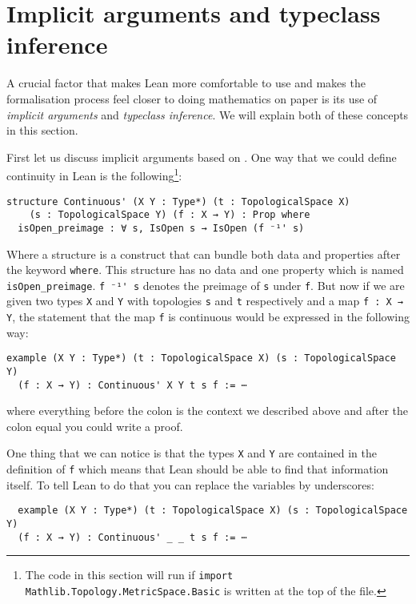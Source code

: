 \section{Implicit arguments and typeclass inference}
\label{sec:implicitandtypeclass}

A crucial factor that makes Lean more comfortable to use and makes the formalisation process feel closer to doing mathematics on paper is its use of \emph{implicit arguments} and \emph{typeclass inference}. 
We will explain both of these concepts in this section.

First let us discuss implicit arguments based on \cite{Avigad2024}. 
One way that we could define continuity in Lean is the following\cprotect\footnote{The code in this section will run if \lstinline{import Mathlib.Topology.MetricSpace.Basic} is written at the top of the file.}:

\begin{lstlisting}
structure Continuous' (X Y : Type*) (t : TopologicalSpace X) 
    (s : TopologicalSpace Y) (f : X → Y) : Prop where
  isOpen_preimage : ∀ s, IsOpen s → IsOpen (f ⁻¹' s)
\end{lstlisting}

Where a structure is a construct that can bundle both data and properties after the keyword \lstinline{where}. 
This structure has no data and one property which is named \lstinline{isOpen_preimage}. 
\lstinline{f ⁻¹' s} denotes the preimage of \lstinline{s} under \lstinline{f}.
But now if we are given two types \lstinline{X} and \lstinline{Y} with topologies \lstinline{s} and \lstinline{t} respectively and a map \lstinline{f : X → Y}, the statement that the map \lstinline{f} is continuous would be expressed in the following way:

\begin{lstlisting}
example (X Y : Type*) (t : TopologicalSpace X) (s : TopologicalSpace Y) 
  (f : X → Y) : Continuous' X Y t s f := ⋯
\end{lstlisting}

where everything before the colon is the context we described above and after the colon equal you could write a proof.

One thing that we can notice is that the types \lstinline{X} and \lstinline{Y} are contained in the definition of \lstinline{f} which means that Lean should be able to find that information itself. 
To tell Lean to do that you can replace the variables by underscores: 

\begin{lstlisting}
  example (X Y : Type*) (t : TopologicalSpace X) (s : TopologicalSpace Y) 
  (f : X → Y) : Continuous' _ _ t s f := ⋯
\end{lstlisting}

